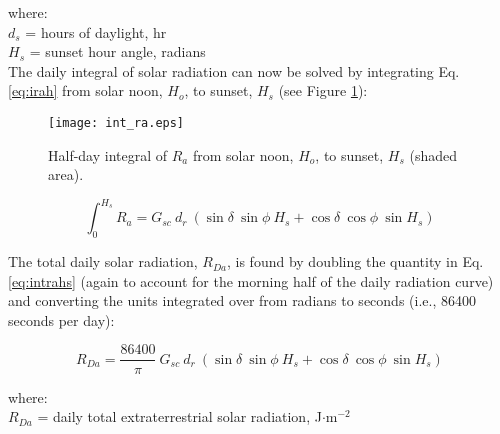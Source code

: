 \noindent where:\\
\indent $d_s$ = hours of daylight, hr\\
\indent $H_s$ = sunset hour angle, radians \\ 

The daily integral of solar radiation can now be solved by integrating Eq. \ref{eq:irah} from solar noon, $H_o$, to sunset, $H_s$ (see Figure \ref{fig:intra}):

\begin{figure}[ht!]
    \texttt{[image: int\_ra.eps]}
    \caption{Half-day integral of $R_a$ from solar noon, $H_o$, to sunset, $H_s$ (shaded area).}
    \label{fig:intra}
\end{figure}

\begin{equation}
\label{eq:intrahs}
	\int_0^{H_s} R_a = G_{sc}\: d_r\: \left( 
	      \sin\delta\: \sin\phi\: H_s + 
	      \cos\delta\: \cos\phi\: \sin H_s \right)
\end{equation}

\noindent The total daily solar radiation, $R_{Da}$, is found by doubling the quantity in Eq. \ref{eq:intrahs} (again to account for the morning half of the daily radiation curve) and converting the units integrated over from radians to seconds (i.e., 86400 seconds per day):

\begin{equation}
\label{eq:dayra}
	R_{Da} = \frac{86400}{\pi}\: G_{sc}\: d_r\: \left( 
	      \sin\delta\: \sin\phi\: H_s + 
	      \cos\delta\: \cos\phi\: \sin H_s \right)
\end{equation}

\noindent where: \\
\indent $R_{Da}$ = daily total extraterrestrial solar radiation, J$\cdot$m$^{-2}$\\

